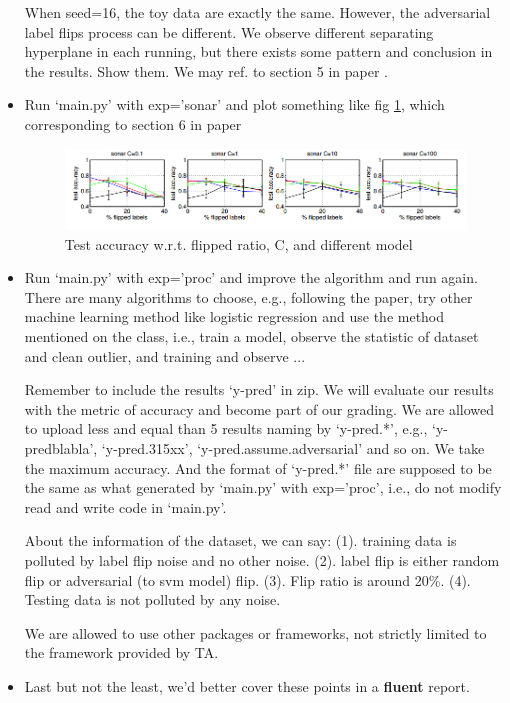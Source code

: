 \documentclass[12pt]{article}
\begin{document}
\begin{itemize}
    When seed=16, the toy data are exactly the same. However, the adversarial label flips process
    can be different. We observe different separating hyperplane in each running, but there exists
    some pattern and conclusion in the results. Show them. We may ref. to section 5 in paper \cite{biggio2011support}.
    \item  Run ‘main.py’ with exp=’sonar’ and plot something like fig \ref{fig:sec6}, which corresponding to section 6 in paper \cite{biggio2011support} 

    \begin{figure}
        \includegraphics[width=.9\textwidth]{fig/sec6.png} 
        \caption{Test accuracy w.r.t. flipped ratio, C, and different model} 
        \label{fig:sec6}
    \end{figure}
    \item Run ‘main.py’ with exp=’proc’ and improve the algorithm and run again. There are many
    algorithms to choose, e.g., following the paper, try other machine learning method like logistic
    regression and use the method mentioned on the class, i.e., train a model, observe the statistic
    of dataset and clean outlier, and training and observe ...

    Remember to include the results ‘y-pred’ in zip. We will evaluate our results with the metric
    of accuracy and become part of our grading. We are allowed to upload less and equal than
    5 results naming by ‘y-pred.*’, e.g., ‘y-predblabla’, ‘y-pred.315xx’, ‘y-pred.assume.adversarial’
    and so on. We take the maximum accuracy. And the format of ‘y-pred.*’ file are supposed
    to be the same as what generated by ‘main.py’ with exp=’proc’, i.e., do not modify read and
    write code in ‘main.py’.

    About the information of the dataset, we can say: (1). training data is polluted by label flip
    noise and no other noise. (2). label flip is either random flip or adversarial (to svm model) flip.
    (3). Flip ratio is around 20\%. (4). Testing data is not polluted by any noise.
    
    We are allowed to use other packages or frameworks, not strictly limited to the framework provided by TA. 
    \item Last but not the least, we'd better cover these points in a \textbf{fluent} report. 
\end{itemize}
\end{document}
